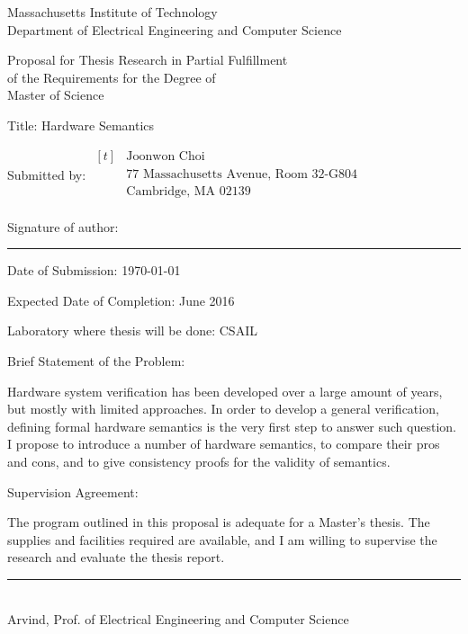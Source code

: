 
\begin{center}
  Massachusetts Institute of Technology\\
  Department of Electrical Engineering and Computer Science\dbsp

  Proposal for Thesis Research in Partial Fulfillment\\
  of the Requirements for the Degree of\\
  Master of Science\dbsp
\end{center}

{\parindent0pt

  Title: Hardware Semantics\dbsp

  Submitted by: $\begin{aligned}[t]
    &\textrm{Joonwon Choi}\\
    &\textrm{77 Massachusetts Avenue, Room 32-G804}\\
    &\textrm{Cambridge, MA 02139}\\
  \end{aligned}$\dbsp

  Signature of author: \rule{10cm}{0.4pt}\dbsp

  Date of Submission: \today\dbsp

  Expected Date of Completion: June 2016\dbsp

  Laboratory where thesis will be done: CSAIL\dbsp

  Brief Statement of the Problem:

  Hardware system verification has been developed over a large amount
  of years, but mostly with limited approaches. In order to develop a
  general verification, defining formal hardware semantics is the very
  first step to answer such question. I propose to introduce a number
  of hardware semantics, to compare their pros and cons, and to give
  consistency proofs for the validity of semantics.\dbsp
  
  Supervision Agreement:

  The program outlined in this proposal is adequate for a Master's
  thesis. The supplies and facilities required are available, and I am
  willing to supervise the research and evaluate the thesis
  report.\dbsp
}

\begin{flushright}
  \rule{10cm}{0.4pt}\\
  Arvind, Prof. of Electrical Engineering and Computer Science
\end{flushright}

\newpage
